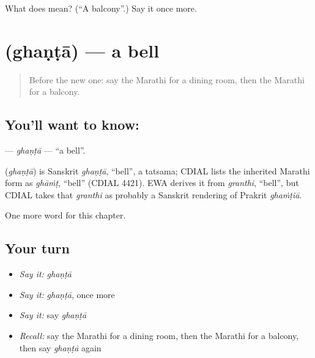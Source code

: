 \begin{tcolorbox}[breakable,colback=teal!4,colframe=teal!35!black,title={Before you move on}]
What does  mean? (\textquotedblleft{}A balcony\textquotedblright{}.) Say it once more.
\end{tcolorbox}
\section[\texorpdfstring{\mr{घंटा} (ghaṇṭā)}{घंटा (ghaṇṭā)}]{ (ghaṇṭā) — a bell}

\label{lesson:MR-C178-ghanta}



\begin{quote}
Before the new one: say the Marathi for a dining room, then the Marathi for a balcony.
\end{quote}

\subsection*{You'll want to know: }
\textbf{} — \emph{ghaṇṭā} — \textquotedblleft{}a bell\textquotedblright{}.

\begin{cousinweb}
\textbf{} (\emph{ghaṇṭā}) is Sanskrit \emph{ghaṇṭā}, \textquotedblleft{}bell\textquotedblright{}, a tatsama; CDIAL lists the inherited Marathi form as \emph{ghāṁṭ}, \textquotedblleft{}bell\textquotedblright{} (CDIAL 4421). EWA derives it from \emph{granthi}, \textquotedblleft{}bell\textquotedblright{}, but CDIAL takes that \emph{granthi} as probably a Sanskrit rendering of Prakrit \emph{ghaṁṭiā}.
\end{cousinweb}

\begin{grammarlens}[title={What you've built}]
One more word for this chapter.
\end{grammarlens}

\subsection*{Your turn}
\begin{itemize}
\raggedright
  \item \emph{Say it:} \emph{ghaṇṭā}
  \item \emph{Say it:} \emph{ghaṇṭā}, once more
  \item \emph{Say it:} say \emph{ghaṇṭā}
  \item \emph{Recall:} say the Marathi for a dining room, then the Marathi for a balcony, then say \emph{ghaṇṭā} again
\end{itemize}

